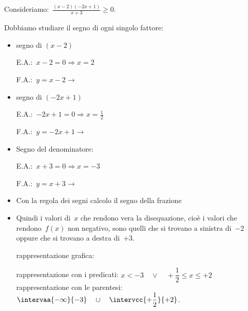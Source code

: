  \begin{esempio}
Consideriamo:~\(\frac{(x-2)(-2x+1)}{x+3} \ge 0\).

Dobbiamo studiare il segno di ogni singolo fattore:
\begin{itemize} [noitemsep]
 \item segno di \((x-2)\)\\
 \begin{minipage}{.45\textwidth}
  E.A.:~\(x-2=0 \Rightarrow x=2\)
 \end{minipage}
 \begin{minipage}{.25\textwidth}
  F.A.:~\(y=x-2 \rightarrow \)
 \end{minipage}
 \begin{minipage}{.3\textwidth}
 \end{minipage}
 \item segno di \((-2x+1)\)\\
 \begin{minipage}{.45\textwidth}
  E.A.:~\(-2x+1=0 \Rightarrow x=\frac{1}{2}\)
 \end{minipage}
 \begin{minipage}{.25\textwidth}
  F.A.:~\(y=-2x+1 \rightarrow \)
 \end{minipage}
 \begin{minipage}{.3\textwidth}
 \end{minipage}
 \item Segno del denominatore:\\
 \begin{minipage}{.45\textwidth}
  E.A.:~\(x + 3=0 \Rightarrow x=-3\)
 \end{minipage}
 \begin{minipage}{.25\textwidth}
  F.A.:~\(y=x +3 \rightarrow \)
 \end{minipage}
 \begin{minipage}{.3\textwidth}
 \end{minipage}
 \item Con la regola dei segni calcolo il segno della frazione 

   \segnomistadisa
 \item Quindi i valori di~\(x\) che rendono vera la disequazione, cioè i valori
  che rendono~\(f(x)\) non negativo, sono quelli 
  che si trovano a sinistra di~\(-2\) oppure che si trovano a destra di~\(+3\). 
 \subitem 
  \begin{minipage}{.35\textwidth}
   rappresentazione grafica: 
  \end{minipage}
  \begin{minipage}{.30\textwidth}
  \end{minipage}
 \subitem rappresentazione con i 
   predicati: \quad \(x < -3 \quad \vee \quad 
                      +\dfrac{1}{2} \le x \le +2\) 
 \subitem rappresentazione con le 
  parentesi:\quad \(\intervaa{-\infty}{-3} \quad \cup \quad 
                    \intervcc{+\dfrac{1}{2}}{+2}\). 
\end{itemize}
 \end{esempio}

